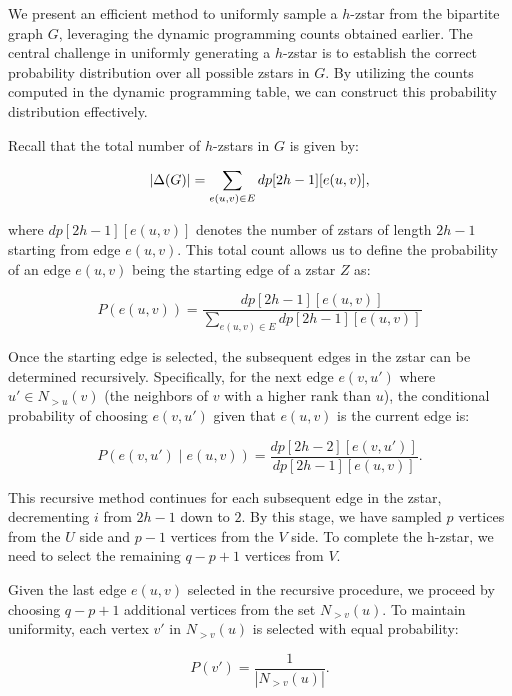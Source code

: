 We present an efficient method to uniformly sample a $h$-zstar from the bipartite graph $G$, leveraging the dynamic programming counts obtained earlier. The central challenge in uniformly generating a $h$-zstar is to establish the correct probability distribution over all possible zstars in $G$. By utilizing the counts computed in the dynamic programming table, we can construct this probability distribution effectively.

Recall that the total number of $h$-zstars in $G$ is given by:

\begin{equation} |\Delta (G)| = \sum_{e(u,v) \in E} dp[2h - 1][e(u,v)], \end{equation}

where $dp[2h - 1][e(u,v)]$ denotes the number of zstars of length $2h - 1$ starting from edge $e(u,v)$. This total count allows us to define the probability of an edge $e(u,v)$ being the starting edge of a zstar $Z$ as:

\begin{equation} P(e(u,v)) = \frac{dp[2h - 1][e(u,v)]}{\sum_{e(u,v) \in E} dp[2h - 1][e(u,v)]} \end{equation}

Once the starting edge is selected, the subsequent edges in the zstar can be determined recursively. Specifically, for the next edge $e(v,u')$ where $u' \in N_{>u}(v)$ (the neighbors of $v$ with a higher rank than $u$), the conditional probability of choosing $e(v,u')$ given that $e(u,v)$ is the current edge is:

\begin{equation} P(e(v,u') \mid e(u,v)) = \frac{dp[2h - 2][e(v,u')]}{dp[2h - 1][e(u,v)]}. \end{equation}

\noindent This recursive method continues for each subsequent edge in the zstar, decrementing $ i $ from $ 2h - 1 $ down to $ 2 $. By this stage, we have sampled $ p $ vertices from the $ U $ side and $ p - 1 $ vertices from the $ V $ side. To complete the h-zstar, we need to select the remaining $ q - p + 1 $ vertices from $ V $.

Given the last edge $ e(u, v) $ selected in the recursive procedure, we proceed by choosing $ q - p + 1 $ additional vertices from the set $N_{>v}(u)$. To maintain uniformity, each vertex $ v' $ in $ N_{>v}(u) $ is selected with equal probability:

\begin{equation}
	P(v') = \frac{1}{\left| N_{>v}(u) \right|}.
\end{equation}

